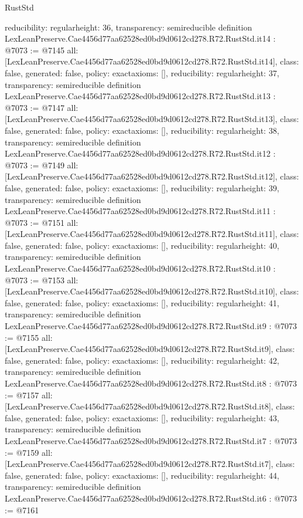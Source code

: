 \begin{lexlean}{RustStd}
\begin{coremodule}
{  reducibility: regular{height: 36},
  transparency: semireducible
}
definition LexLeanPreserve.Cae4456d77aa62528ed0bd9d0612cd278.R72.RustStd.it14 : @7073 := @7145 {
  all: [LexLeanPreserve.Cae4456d77aa62528ed0bd9d0612cd278.R72.RustStd.it14],
  class: false,
  generated: false,
  policy: exact{axioms: []},
  reducibility: regular{height: 37},
  transparency: semireducible
}
definition LexLeanPreserve.Cae4456d77aa62528ed0bd9d0612cd278.R72.RustStd.it13 : @7073 := @7147 {
  all: [LexLeanPreserve.Cae4456d77aa62528ed0bd9d0612cd278.R72.RustStd.it13],
  class: false,
  generated: false,
  policy: exact{axioms: []},
  reducibility: regular{height: 38},
  transparency: semireducible
}
definition LexLeanPreserve.Cae4456d77aa62528ed0bd9d0612cd278.R72.RustStd.it12 : @7073 := @7149 {
  all: [LexLeanPreserve.Cae4456d77aa62528ed0bd9d0612cd278.R72.RustStd.it12],
  class: false,
  generated: false,
  policy: exact{axioms: []},
  reducibility: regular{height: 39},
  transparency: semireducible
}
definition LexLeanPreserve.Cae4456d77aa62528ed0bd9d0612cd278.R72.RustStd.it11 : @7073 := @7151 {
  all: [LexLeanPreserve.Cae4456d77aa62528ed0bd9d0612cd278.R72.RustStd.it11],
  class: false,
  generated: false,
  policy: exact{axioms: []},
  reducibility: regular{height: 40},
  transparency: semireducible
}
definition LexLeanPreserve.Cae4456d77aa62528ed0bd9d0612cd278.R72.RustStd.it10 : @7073 := @7153 {
  all: [LexLeanPreserve.Cae4456d77aa62528ed0bd9d0612cd278.R72.RustStd.it10],
  class: false,
  generated: false,
  policy: exact{axioms: []},
  reducibility: regular{height: 41},
  transparency: semireducible
}
definition LexLeanPreserve.Cae4456d77aa62528ed0bd9d0612cd278.R72.RustStd.it9 : @7073 := @7155 {
  all: [LexLeanPreserve.Cae4456d77aa62528ed0bd9d0612cd278.R72.RustStd.it9],
  class: false,
  generated: false,
  policy: exact{axioms: []},
  reducibility: regular{height: 42},
  transparency: semireducible
}
definition LexLeanPreserve.Cae4456d77aa62528ed0bd9d0612cd278.R72.RustStd.it8 : @7073 := @7157 {
  all: [LexLeanPreserve.Cae4456d77aa62528ed0bd9d0612cd278.R72.RustStd.it8],
  class: false,
  generated: false,
  policy: exact{axioms: []},
  reducibility: regular{height: 43},
  transparency: semireducible
}
definition LexLeanPreserve.Cae4456d77aa62528ed0bd9d0612cd278.R72.RustStd.it7 : @7073 := @7159 {
  all: [LexLeanPreserve.Cae4456d77aa62528ed0bd9d0612cd278.R72.RustStd.it7],
  class: false,
  generated: false,
  policy: exact{axioms: []},
  reducibility: regular{height: 44},
  transparency: semireducible
}
definition LexLeanPreserve.Cae4456d77aa62528ed0bd9d0612cd278.R72.RustStd.it6 : @7073 := @7161 {
}
\end{coremodule}
\end{lexlean}
